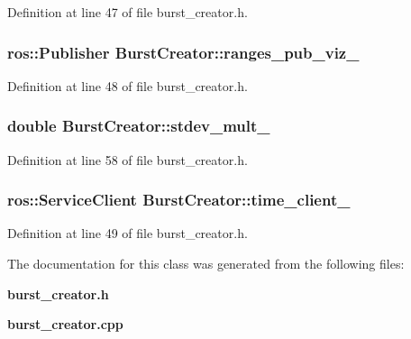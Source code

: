 \-Definition at line 47 of file burst\-\_\-creator.\-h.

\subsubsection[{ranges\-\_\-pub\-\_\-viz\-\_\-}]{\setlength{\rightskip}{0pt plus 5cm}ros\-::\-Publisher {\bf \-Burst\-Creator\-::ranges\-\_\-pub\-\_\-viz\-\_\-}\hspace{0.3cm}{\ttfamily  [private]}}\label{classBurstCreator_aefe70e294adcdf047f5df52f5a4fc02e}


\-Definition at line 48 of file burst\-\_\-creator.\-h.

\subsubsection[{stdev\-\_\-mult\-\_\-}]{\setlength{\rightskip}{0pt plus 5cm}double {\bf \-Burst\-Creator\-::stdev\-\_\-mult\-\_\-}\hspace{0.3cm}{\ttfamily  [private]}}\label{classBurstCreator_aa399410aade18b8d67e37dfb56a6f8f8}


\-Definition at line 58 of file burst\-\_\-creator.\-h.

\subsubsection[{time\-\_\-client\-\_\-}]{\setlength{\rightskip}{0pt plus 5cm}ros\-::\-Service\-Client {\bf \-Burst\-Creator\-::time\-\_\-client\-\_\-}\hspace{0.3cm}{\ttfamily  [private]}}\label{classBurstCreator_aa041d74abf60d13124938deee8d80cc0}


\-Definition at line 49 of file burst\-\_\-creator.\-h.



\-The documentation for this class was generated from the following files\-:\begin{DoxyCompactItemize}
\item 
{\bf burst\-\_\-creator.\-h}\item 
{\bf burst\-\_\-creator.\-cpp}\end{DoxyCompactItemize}
